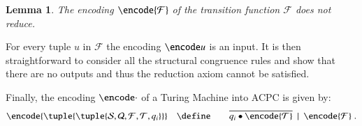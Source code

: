 \documentclass[submission,copyright,creativecommons]{eptcs}
\def\BNF{\ \  | \ \  }
\newtheorem{lemma}[theorem]{Lemma}
\newenvironment{proof}[1][Proof]{\begin{trivlist}
\item[\hskip \labelsep {\bfseries #1}]}{\end{trivlist}}
\newcommand{\oan}[1]{\overline{#1}}
\newcommand{\tmach}[1]{\tuple{\tuple{#1}}}
\begin{document}
\begin{lemma}
\label{lem:trans-no-red}
The encoding $\encode{{\mathcal F}}$ of the transition function ${\mathcal F}$
does not reduce.
\end{lemma}
\begin{proof}
For every tuple $u$ in ${\mathcal F}$ the encoding $\encode u$ is an input.
It is then straightforward to consider all the structural congruence rules
and show that there are no outputs and thus the reduction axiom cannot be satisfied.
\end{proof}

Finally, the encoding $\encode\cdot$ of a Turing Machine into ACPC is given by:
\begin{eqnarray*}
\encode{\tmach{{\mathcal S}, {\mathcal Q}, {\mathcal F}, {\mathcal T}, q_i}}
&\quad\define\quad&
\oan {q_i\bullet \encode {\mathcal T}}
\BNF
\encode{\mathcal F}\; .
\end{eqnarray*}
\end{document}
